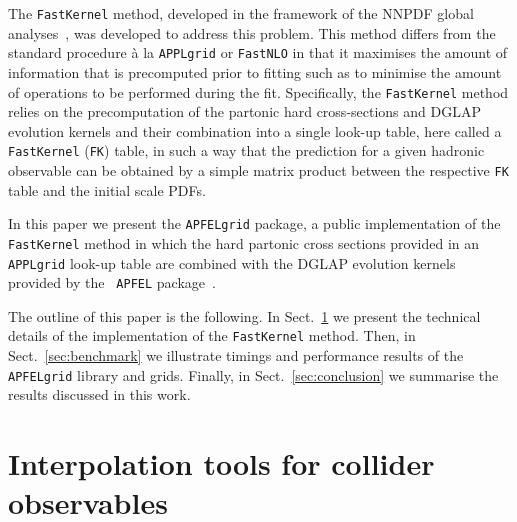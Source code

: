 \documentclass[preprint,12pt]{elsarticle}
\begin{document}
The {\tt FastKernel} method, developed in the framework of the NNPDF
global analyses~\cite{Ball:2010de,Ball:2014uwa}, was developed to
address this problem. This method differs from the standard procedure
\`{a} la {\tt APPLgrid} or {\tt FastNLO} in that it maximises the
amount of information that is precomputed prior to fitting such as to
minimise the amount of operations to be performed during the
fit. Specifically, the {\tt FastKernel} method relies on the
precomputation of the partonic hard cross-sections and DGLAP evolution
kernels and their combination into a single look-up table, here called
a {\tt FastKernel} ({\tt FK}) table, in such a way that the prediction
for a given hadronic observable can be obtained by a simple matrix
product between the respective {\tt FK} table and the initial scale
PDFs.

In this paper we present the {\tt APFELgrid} package, a public
implementation of the {\tt FastKernel} method in which the hard
partonic cross sections provided in an {\tt APPLgrid} look-up table
are combined with the DGLAP evolution kernels provided by the {\tt
  APFEL}
package~\cite{Bertone:2013vaa,Carrazza:2014gfa,Bertone:2015cwa,Bertone:2015lqa,Carrazza:2015dea,Bertone:2015gba}.

The outline of this paper is the following. In
Sect.~\ref{sec:FastKernel} we present the technical details of the
implementation of the {\tt FastKernel} method. Then, in
Sect.~\ref{sec:benchmark} we illustrate timings and performance
results of the {\tt APFELgrid} library and grids. Finally, in
Sect.~\ref{sec:conclusion} we summarise the results discussed in this
work.

\section{Interpolation tools for collider observables}\label{sec:FastKernel}
\end{document}
